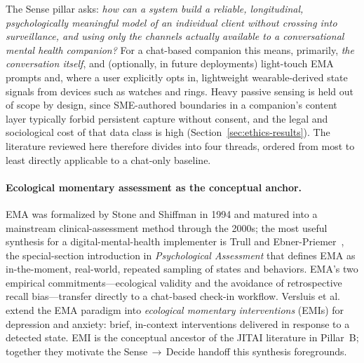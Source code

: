 \documentclass[11pt,a4paper]{article}
\newcommand{\secref}[1]{Section~\ref{#1}}
\begin{document}
The Sense pillar asks: \emph{how can a system build a reliable,
longitudinal, psychologically meaningful model of an individual
client without crossing into surveillance, and using only the
channels actually available to a conversational mental health
companion?} For a chat-based companion this means, primarily,
\emph{the conversation itself}, and (optionally, in future
deployments) light-touch EMA prompts and, where a user explicitly
opts in, lightweight wearable-derived state signals from devices
such as watches and rings. Heavy passive sensing is held out of
scope by design, since SME-authored boundaries in a companion's
content layer typically forbid persistent capture without consent,
and the legal and sociological cost of that data class is high
(\secref{sec:ethics-results}). The literature reviewed here
therefore divides into four threads, ordered from most to least
directly applicable to a chat-only baseline.

\paragraph{Ecological momentary assessment as the conceptual anchor.}
EMA was formalized by Stone and Shiffman in 1994 and matured into a
mainstream clinical-assessment method through the 2000s; the most
useful synthesis for a digital-mental-health implementer is
Trull and Ebner-Priemer~\cite{Trull2009ESMEMA}, the special-section
introduction in \emph{Psychological Assessment} that defines EMA as
in-the-moment, real-world, repeated sampling of states and
behaviors. EMA's two empirical commitments---ecological validity
and the avoidance of retrospective recall bias---transfer directly
to a chat-based check-in workflow. Versluis et
al.~\cite{Versluis2016EMI} extend the EMA paradigm into
\emph{ecological momentary interventions} (EMIs) for depression and
anxiety: brief, in-context interventions delivered in response to a
detected state. EMI is the conceptual ancestor of the JITAI
literature in Pillar~B; together they motivate the
Sense$\,\to\,$Decide handoff this synthesis foregrounds.
\end{document}
